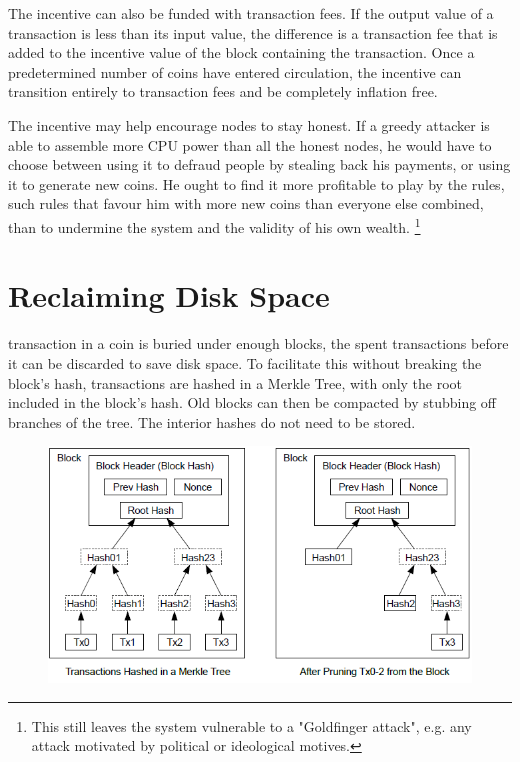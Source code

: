 \documentclass[nohyper]{tufte-handout}
\begin{document}
The incentive can also be funded with transaction fees. If the output
value of a transaction is less than its input value, the difference is a
transaction fee that is added to the incentive value of the block
containing the transaction. Once a predetermined number of coins have
entered circulation, the incentive can transition entirely to
transaction fees and be completely inflation free.

The incentive may help encourage nodes to stay honest. If a greedy
attacker is able to assemble more CPU power than all the honest nodes,
he would have to choose between using it to defraud people by stealing
back his payments, or using it to generate new coins. He ought to find
it more profitable to play by the rules, such rules that favour him with
more new coins than everyone else combined, than to undermine the system
and the validity of his own wealth.  \footnote[][-1in]{This still leaves the system vulnerable to a "Goldfinger attack", e.g. any attack motivated by political or ideological motives.}

\section{Reclaiming Disk Space}\label{reclaiming-disk-space}

 transaction in a coin is buried under enough blocks, the
spent transactions before it can be discarded to save disk space. To
facilitate this without breaking the block's hash, transactions are
hashed in a Merkle Tree\cite[-1.7in]{mer80}\cite[-1.1in]{mas99}\cite[-0.25in]{hab97}, with only the root included in the block's hash. Old
blocks can then be compacted by stubbing off branches of the tree. The
interior hashes do not need to be stored.

\begin{figure}[!h]
\centering
\includegraphics[width=0.75\linewidth]{reclaiming-disk.png}
\end{figure}
\end{document}
